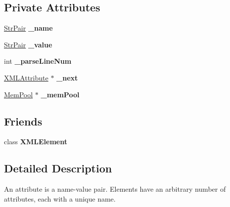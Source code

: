 \subsection*{Private Attributes}
\begin{DoxyCompactItemize}
\item 
\hyperlink{classtinyxml2_1_1StrPair}{Str\+Pair} {\bfseries \+\_\+name}\hypertarget{classtinyxml2_1_1XMLAttribute_a80850208963b536e9254a7fa1d4abe67}{}\label{classtinyxml2_1_1XMLAttribute_a80850208963b536e9254a7fa1d4abe67}

\item 
\hyperlink{classtinyxml2_1_1StrPair}{Str\+Pair} {\bfseries \+\_\+value}\hypertarget{classtinyxml2_1_1XMLAttribute_abcf5c9b7f040ed71ed2a66557584b5b0}{}\label{classtinyxml2_1_1XMLAttribute_abcf5c9b7f040ed71ed2a66557584b5b0}

\item 
int {\bfseries \+\_\+parse\+Line\+Num}\hypertarget{classtinyxml2_1_1XMLAttribute_a3ccce78440ebad696e6958cb51aead9e}{}\label{classtinyxml2_1_1XMLAttribute_a3ccce78440ebad696e6958cb51aead9e}

\item 
\hyperlink{classtinyxml2_1_1XMLAttribute}{X\+M\+L\+Attribute} $\ast$ {\bfseries \+\_\+next}\hypertarget{classtinyxml2_1_1XMLAttribute_a3bbf00f77131a8e83d648d32d090c564}{}\label{classtinyxml2_1_1XMLAttribute_a3bbf00f77131a8e83d648d32d090c564}

\item 
\hyperlink{classtinyxml2_1_1MemPool}{Mem\+Pool} $\ast$ {\bfseries \+\_\+mem\+Pool}\hypertarget{classtinyxml2_1_1XMLAttribute_ac0a1130568dd9e985dd7753ae44fcdbf}{}\label{classtinyxml2_1_1XMLAttribute_ac0a1130568dd9e985dd7753ae44fcdbf}

\end{DoxyCompactItemize}
\subsection*{Friends}
\begin{DoxyCompactItemize}
\item 
class {\bfseries X\+M\+L\+Element}\hypertarget{classtinyxml2_1_1XMLAttribute_ac2fba9b6e452829dd892f7392c24e0eb}{}\label{classtinyxml2_1_1XMLAttribute_ac2fba9b6e452829dd892f7392c24e0eb}

\end{DoxyCompactItemize}


\subsection{Detailed Description}
An attribute is a name-\/value pair. Elements have an arbitrary number of attributes, each with a unique name.

